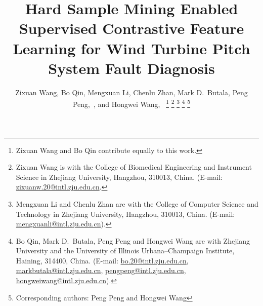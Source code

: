 \documentclass[lettersize,journal]{IEEEtran}
\begin{document}
\title{Hard Sample Mining Enabled Supervised Contrastive Feature Learning for Wind Turbine Pitch System Fault Diagnosis}


\author{Zixuan Wang, Bo Qin, Mengxuan Li, Chenlu Zhan, Mark D.\ Butala, Peng Peng,~, and Hongwei Wang,~
\thanks{Zixuan Wang and Bo Qin contribute equally to this work.}
\thanks{Zixuan Wang is with the College of Biomedical Engineering and Instrument Science in Zhejiang University, Hangzhou, 310013, China. (E-mail: \href{mailto:zixuanw.20@intl.zju.edu.cn}{zixuanw.20@intl.zju.edu.cn}.}
\thanks{Mengxuan Li and Chenlu Zhan are with the College of Computer Science and Technology in Zhejiang University, Hangzhou, 310013, China. (E-mail: \href{mailto:mengxuanli@intl.zju.edu.cn}{mengxuanli@intl.zju.edu.cn}).}
\thanks{Bo Qin, Mark D.\ Butala, Peng Peng and Hongwei Wang are with Zhejiang University and the University of Illinois Urbana–Champaign Institute, Haining, 314400, China. (E-mail:  \href{mailto:bo.20@intl.zju.edu.cn}{bo.20@intl.zju.edu.cn}, 
\href{mailto:markbutala@intl.zju.edu.cn}{markbutala@intl.zju.edu.cn}, \href{mailto:pengpeng@intl.zju.edu.cn}{pengpeng@intl.zju.edu.cn}, \href{mailto:hongweiwang@intl.zju.edu.cn}{hongweiwang@intl.zju.edu.cn}).}
\thanks{Corresponding authors: Peng Peng and Hongwei Wang}
        }

\end{document}
